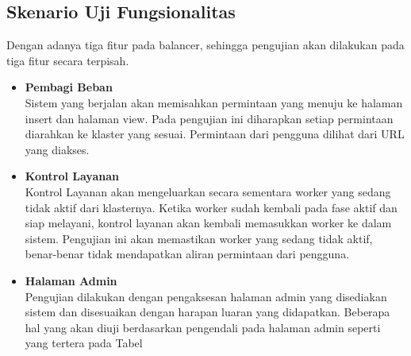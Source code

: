 \documentclass{ta-its}
\begin{document}
			\subsection{Skenario Uji Fungsionalitas}
				Dengan adanya tiga fitur pada balancer, sehingga pengujian akan dilakukan pada tiga fitur secara terpisah.
				\begin{itemize}
					\item \textbf{Pembagi Beban} \\
					Sistem yang berjalan akan memisahkan permintaan yang menuju	ke halaman insert dan halaman view. Pada pengujian ini diharapkan setiap permintaan diarahkan ke klaster yang sesuai. Permintaan dari pengguna dilihat dari URL yang diakses.
					\item \textbf{Kontrol Layanan} \\
					Kontrol Layanan akan mengeluarkan secara sementara worker yang sedang tidak aktif dari klasternya. Ketika worker sudah kembali pada fase aktif dan siap melayani, kontrol layanan akan kembali memasukkan worker ke dalam sistem. Pengujian ini akan memastikan worker yang sedang tidak aktif, benar-benar tidak mendapatkan aliran permintaan dari pengguna.
					\item \textbf{Halaman Admin} \\
					Pengujian dilakukan dengan pengaksesan halaman admin yang disediakan sistem dan disesuaikan dengan harapan luaran yang didapatkan. Beberapa hal yang akan diuji berdasarkan pengendali pada halaman admin seperti yang tertera pada Tabel
				\end{itemize}
				
\end{document}

